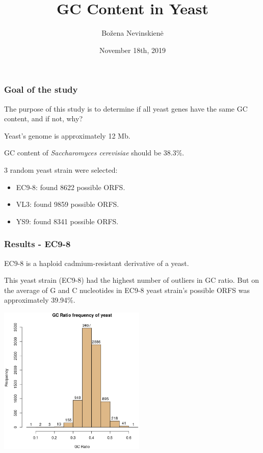 \documentclass{beamer}
\title[Short title]{GC Content in Yeast} %
\author{Bo\v{z}ena Nevinskien\.{e}} %
\institute[UCLA] %
{
Vilnius University, Systems Biology \\ %
\medskip
}
\date{November 18th, 2019}
\begin{document}
\begin{frame}
\titlepage 
\end{frame}


\begin{frame}
\frametitle{Goal of the study}
The purpose of this study is to determine if all yeast genes have the same GC content, and if not, why? 

Yeast's genome is approximately 12 Mb. 

GC content of \emph{Saccharomyces cerevisiae} should be 38.3\%.

3 random yeast strain were selected:
\begin{itemize}
\item EC9-8: found 8622 possible ORFS.
\item VL3: found 9859 possible ORFS.
\item YS9: found 8341 possible ORFS.
\end{itemize}
\end{frame}


\begin{frame}
\frametitle{Results - EC9-8}
EC9-8 is a haploid cadmium-resistant derivative of a yeast.

This yeast strain (EC9-8) had the highest number of outliers in GC ratio.
But on the average of G and C nucleotides in EC9-8 yeast strain's possible ORFS was approximately 39.94\%.
\begin{minipage}{0.5\textwidth}
\includegraphics[width=70mm]{images/EC9-8_ASinica_2011_AGSJ01000000.eps}
\end{minipage}
\end{frame}
\end{document}
